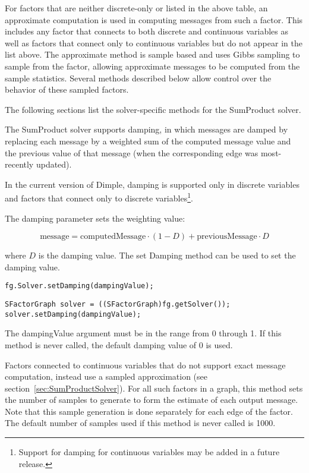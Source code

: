 For factors that are neither discrete-only or listed in the above table, an approximate computation is used in computing messages from such a factor.  This includes any factor that connects to both discrete and continuous variables as well as factors that connect only to continuous variables but do not appear in the list above.  The approximate method is sample based and uses Gibbs sampling to sample from the factor, allowing approximate messages to be computed from the sample statistics.  Several methods described below allow control over the behavior of these sampled factors.

The following sections list the solver-specific methods for the SumProduct solver.



The SumProduct solver supports damping, in which messages are damped by replacing each message by a weighted sum of the computed message value and the previous value of that message (when the corresponding edge was most-recently updated).

In the current version of Dimple, damping is supported only in discrete variables and factors that connect only to discrete variables\footnote{Support for damping for continuous variables may be added in a future release.}.

The damping parameter sets the weighting value:

\[
\mathrm{message} = \mathrm{computedMessage} \cdot (1 - D) + \mathrm{previousMessage} \cdot D
\]

where $D$ is the damping value.  The set Damping method can be used to set the damping value.

\ifmatlab
\begin{lstlisting}
fg.Solver.setDamping(dampingValue);
\end{lstlisting}
\fi

\ifjava
\begin{lstlisting}
SFactorGraph solver = ((SFactorGraph)fg.getSolver());
solver.setDamping(dampingValue);
\end{lstlisting}
\fi

The dampingValue argument must be in the range from 0 through 1.  If this method is never called, the default damping value of 0 is used.


Factors connected to continuous variables that do not support exact message computation, instead use a sampled approximation (see section~\ref{sec:SumProductSolver}).  For all such factors in a graph, this method sets the number of samples to generate to form the estimate of each output message.  Note that this sample generation is done separately for each edge of the factor.  The default number of samples used if this method is never called is 1000.


